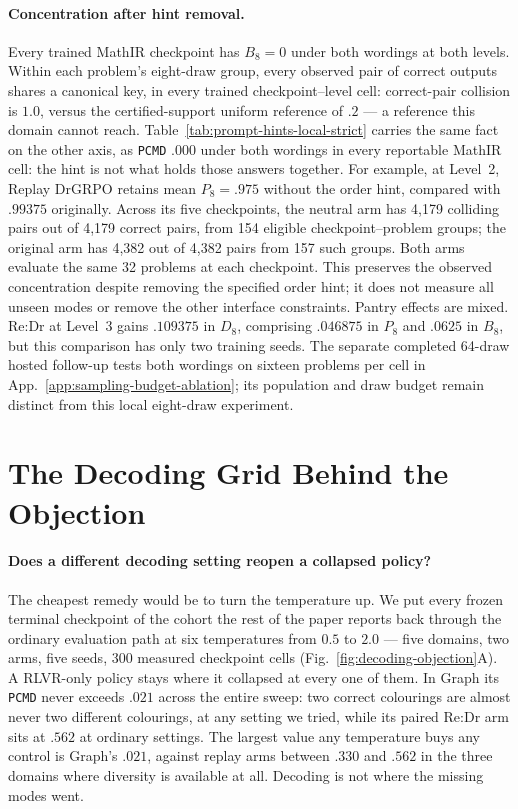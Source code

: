 \documentclass{article}
\newcommand{\1}{\mathbf 1}
\newcommand{\pmd}{\texttt{PCMD}}
\theoremstyle{remark}
\theoremstyle{definition}
\theoremstyle{plain}
\begin{document}
\paragraph{Concentration after hint removal.}
Every trained MathIR checkpoint has $B_8=0$ under both wordings at both levels.
Within each problem's eight-draw group, every observed pair of correct
outputs shares a canonical key, in every trained checkpoint--level cell:
correct-pair collision is $1.0$, versus the
certified-support uniform reference of $.2$ --- a reference this domain
cannot reach.
Table~\ref{tab:prompt-hints-local-strict}
carries the same fact on the other axis, as \pmd{} $.000$ under both wordings in
every reportable MathIR cell: the hint is not what holds those answers together. For example, at Level~2, Replay
DrGRPO retains mean $P_8=.975$ without the order hint, compared with $.99375$
originally. Across its five checkpoints, the neutral arm has 4,179 colliding
pairs out of 4,179 correct pairs, from 154 eligible checkpoint--problem
groups; the original arm has 4,382 out of 4,382 pairs from 157 such groups.
Both arms evaluate the same 32 problems at each checkpoint. This preserves
the observed concentration despite removing the specified order hint; it does
not measure all unseen modes or remove the other interface constraints.
Pantry effects are mixed. Re:Dr at Level~3 gains $.109375$ in $D_8$,
comprising $.046875$ in $P_8$ and $.0625$ in $B_8$, but this comparison has only
two training seeds. The separate completed 64-draw hosted follow-up
tests both wordings on sixteen problems per cell in
App.~\ref{app:sampling-budget-ablation}; its population and draw budget
remain distinct from this local eight-draw experiment.


\section{The Decoding Grid Behind the Objection}
\label{app:decoding-objection}

\paragraph{Does a different decoding setting reopen a collapsed policy?}
The cheapest remedy would be to turn the temperature up. We put every frozen
terminal checkpoint of the cohort the rest of the paper reports back through
the ordinary evaluation path at six temperatures from $0.5$ to $2.0$ --- five
domains, two arms, five seeds, 300 measured checkpoint cells
(Fig.~\ref{fig:decoding-objection}A). A RLVR-only policy stays where it
collapsed at every one of them. In Graph its \pmd{} never exceeds $.021$ across
the entire sweep: two correct colourings are almost never two different
colourings, at any setting we tried, while its paired Re:Dr arm sits at $.562$
at ordinary settings. The largest value any temperature buys any control is
Graph's $.021$, against replay arms between $.330$ and $.562$ in the three
domains where diversity is available at all. Decoding is not where the missing
modes went.
\end{document}
